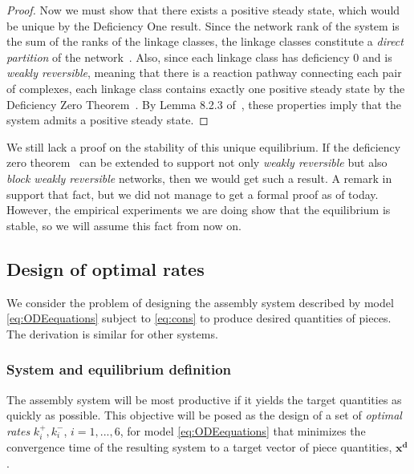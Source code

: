 \begin{proof}
		Now we must show that there exists a positive steady state, which
		would be unique by the Deficiency One result.  Since the network
		rank of the system is the sum of the ranks of the linkage classes,
		the linkage classes constitute a {\it direct partition} of the
		network~\cite{Feinberg:1995p9419}.  Also, since each linkage class
		has deficiency $0$ and is {\it weakly reversible}, meaning that
		there is a reaction pathway connecting each pair of complexes, each
		linkage class contains exactly one positive steady state by the
		Deficiency Zero Theorem~\cite{Feinberg:1987p9428}.  By Lemma 8.2.3
		of~\cite{Feinberg:1995p9419}, these properties imply that the system
		admits a positive steady state.
			
		\end{proof}
		
		We still lack a proof on the stability of this unique equilibrium. If the deficiency zero theorem~\cite{Feinberg:1987p9428} can be extended to support not only \textit{weakly reversible} but also \textit{block weakly reversible} networks, then we would get such a result. A remark in~\cite{Chaves:2004p9259} support that fact, but we did not manage to get a formal proof as of today. However, the empirical experiments we are doing show that the equilibrium is stable, so we will assume this fact from now on. 
	
	\subsection{Design of optimal rates} %
	\label{sub:design_of_optimal_rates}
			
		We consider the problem of designing the assembly system
		described by model \eqref{eq:ODEequations} subject to
		\eqref{eq:cons} to produce desired quantities of pieces. The derivation is similar for other systems.
		
		\subsubsection{System and equilibrium definition} %
		\label{ssub:system_and_equilibrium_definition}
		The assembly system will be most productive if it yields the target
		quantities as quickly as possible.  This objective will be posed as
		the design of a set of {\it optimal rates} $k_i^+, k_i^-$, $i=1,...,6$, for
		model \eqref{eq:ODEequations} that minimizes the convergence time
		of the resulting system to a target vector of piece quantities,
		$\mathbf{x^d}$.
		
